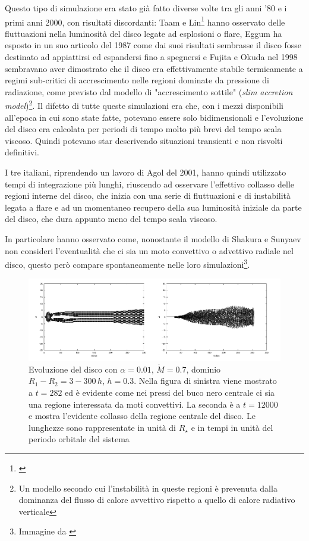 \documentclass[a4paperbi]{article}
\begin{document}
	Questo tipo di simulazione era stato già fatto diverse volte tra gli anni '80 e i primi anni 2000, con risultati discordanti: Taam e Lin\footnote{\cite{TaamLin1984}} hanno osservato delle fluttuazioni nella luminosità del disco legate ad esplosioni o flare, Eggum ha esposto in un suo articolo del 1987 come dai suoi risultati sembrasse il disco fosse destinato ad appiattirsi ed espandersi fino a spegnersi e Fujita e Okuda nel 1998 sembravano aver dimostrato che il disco era effettivamente stabile termicamente a regimi sub-critici di accrescimento nelle regioni dominate da pressione di radiazione, come previsto dal modello di "accrescimento sottile" (\textit{slim accretion model})\footnote{Un modello secondo cui l'instabilità in queste regioni è prevenuta dalla dominanza del flusso di calore avvettivo rispetto a quello di calore radiativo verticale}. Il difetto di tutte queste simulazioni era che, con i mezzi disponibili all'epoca in cui sono state fatte, potevano essere solo bidimensionali e l'evoluzione del disco era calcolata per periodi di tempo molto più brevi del tempo scala viscoso. Quindi potevano star descrivendo situazioni transienti e non risvolti definitivi.
	
	I tre italiani, riprendendo un lavoro di Agol del 2001, hanno quindi utilizzato tempi di integrazione più lunghi, riuscendo ad osservare l'effettivo collasso delle regioni interne del disco, che inizia con una serie di fluttuazioni e di instabilità legata a flare e ad un momentaneo recupero della sua luminosità iniziale da parte del disco, che dura appunto meno del tempo scala viscoso.
	
	In particolare hanno osservato come, nonostante il modello di Shakura e Sunyaev non consideri l'eventualità che ci sia un moto convettivo o advettivo radiale nel disco, questo però compare spontaneamente nelle loro simulazioni\footnote{Immagine da \cite{TeresiMolteniToscano2004}}.

	\begin{figure}[H]
		\centering
		\includegraphics[width=1\linewidth]{CollassoDisco1}
		\caption{Evoluzione del disco con $\alpha=0.01$, $\dot{M}=0.7$, dominio $R_1-R_2=3-300\,h$, $h=0.3$. Nella figura di sinistra viene mostrato a $t=282$ ed è evidente come nei pressi del buco nero centrale ci sia una regione interessata da moti convettivi. La seconda è a $t=12000$ e mostra l'evidente collasso della regione centrale del disco. Le lunghezze sono rappresentate in unità di $R_\star$ e in tempi in unità del periodo orbitale del sistema}
		\label{fig:CollassoDisco1}
	\end{figure}
\end{document}
